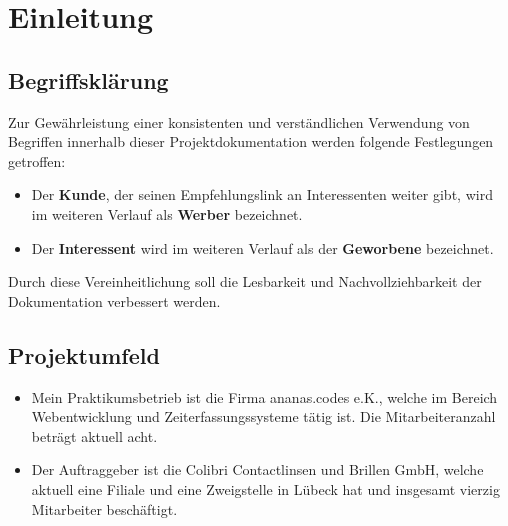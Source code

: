 \section{Einleitung}
\label{sec:Einleitung}

\subsection{Begriffsklärung}
\label{sec:Begriffsklaerung}
Zur Gewährleistung einer konsistenten und verständlichen Verwendung von Begriffen innerhalb dieser Projektdokumentation werden folgende Festlegungen getroffen:
\begin{itemize}
    \item Der \textbf{Kunde}, der seinen Empfehlungslink an Interessenten weiter gibt, wird im weiteren Verlauf als \textbf{Werber} bezeichnet.
    \item Der \textbf{Interessent} wird im weiteren Verlauf als der \textbf{Geworbene} bezeichnet.
\end{itemize}
Durch diese Vereinheitlichung soll die Lesbarkeit und Nachvollziehbarkeit der Dokumentation verbessert werden.

\subsection{Projektumfeld} 
\label{sec:Projektumfeld}
\begin{itemize}
	\item Mein Praktikumsbetrieb ist die Firma ananas.codes e.K., welche im Bereich Webentwicklung und Zeiterfassungssysteme tätig ist. Die Mitarbeiteranzahl beträgt aktuell acht.
	\item Der Auftraggeber ist die Colibri Contactlinsen und Brillen GmbH, welche aktuell eine Filiale und eine Zweigstelle in Lübeck hat und insgesamt vierzig Mitarbeiter beschäftigt.
\end{itemize}


